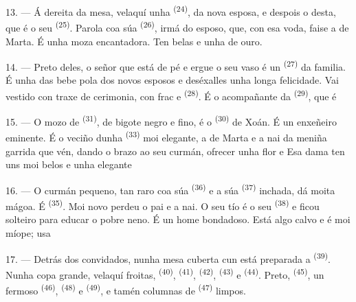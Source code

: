 \VUsaut{3.0mm}

13. --- Á dereita da mesa, velaquí unha  \textsuperscript{(24)},
 da nova esposa, e despois o  desta, que é o seu
 \textsuperscript{(25)}. Parola coa súa  \textsuperscript{(26)}, irmá do esposo, que, con esa voda, faise a
 de Marta. É unha moza encantadora. Ten belas  e unha  de ouro.

14. --- Preto deles, o señor que está de pé e ergue o seu vaso é un 
\textsuperscript{(27)} da familia. É unha das 
 bebe pola  dos novos esposos e deséxalles unha longa
felicidade. Vai vestido con traxe de cerimonia, con frac e  \textsuperscript{(28)}. É o acompañante da 
\textsuperscript{(29)}, que é 

15. --- O mozo de  \textsuperscript{(31)}, de bigote negro e fino, é o
 \textsuperscript{(30)} de Xoán. É un enxeñeiro eminente. É o veciño
dunha  \textsuperscript{(33)} moi elegante, a 
de Marta e a nai da meniña garrida que vén, dando o brazo ao seu curmán, ofrecer unha
flor e   Esa dama ten uns 
moi belos e unha elegante 

16. --- O curmán pequeno, tan raro coa súa  \textsuperscript{(36)} e a
súa  \textsuperscript{(37)} inchada, dá moita mágoa. É 
\textsuperscript{(35)}. Moi novo perdeu o pai e a nai. O seu tío é o seu
 \textsuperscript{(38)} e ficou solteiro para educar o pobre neno. É un
home bondadoso. Está algo calvo e é moi míope; usa 

\VUsaut{2.4mm}
\VUsaut{3.0mm}

17. --- Detrás dos convidados, nunha mesa cuberta cun  está preparada
a  \textsuperscript{(39)}. Nunha copa grande, velaquí froitas,
 \textsuperscript{(40)},  \textsuperscript{(41)},
 \textsuperscript{(42)},  \textsuperscript{(43)} e
 \textsuperscript{(44)}. Preto, 
\textsuperscript{(45)}, un fermoso  \textsuperscript{(46)},
 \textsuperscript{(48)} e 
\textsuperscript{(49)}, e tamén columnas de  \textsuperscript{(47)}
limpos.

